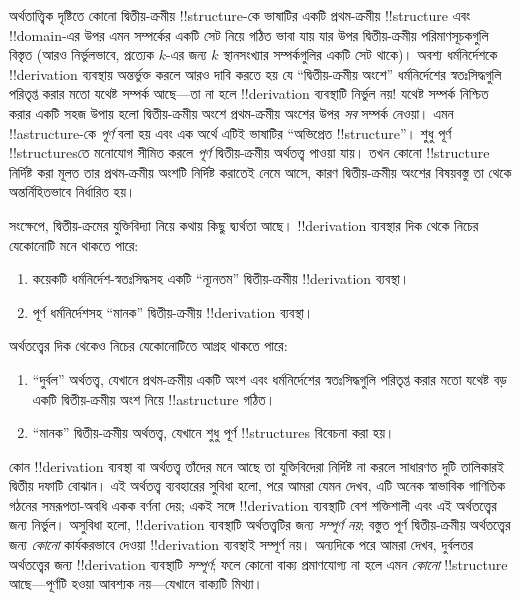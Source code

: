 \documentclass[../../../include/open-logic-section]{subfiles}
\begin{document}
অর্থতাত্ত্বিক দৃষ্টিতে কোনো দ্বিতীয়-ক্রমীয় !!{structure}-কে ভাষাটির
একটি প্রথম-ক্রমীয় !!{structure} এবং !!{domain}-এর উপর এমন সম্পর্কের
একটি সেট নিয়ে গঠিত ভাবা যায় যার উপর দ্বিতীয়-ক্রমীয় পরিমাণসূচকগুলি
বিস্তৃত (আরও নির্ভুলভাবে, প্রত্যেক $k$-এর জন্য $k$ স্থানসংখ্যার
সম্পর্কগুলির একটি সেট থাকে)। অবশ্য ধর্মনির্দেশকে !!{derivation}
ব্যবস্থায় অন্তর্ভুক্ত করলে আরও দাবি করতে হয় যে “দ্বিতীয়-ক্রমীয়
অংশে” ধর্মনির্দেশের স্বতঃসিদ্ধগুলি পরিতৃপ্ত করার মতো যথেষ্ট সম্পর্ক
আছে---তা না হলে !!{derivation} ব্যবস্থাটি নির্ভুল নয়!{} যথেষ্ট সম্পর্ক
নিশ্চিত করার একটি সহজ উপায় হলো দ্বিতীয়-ক্রমীয় অংশে প্রথম-ক্রমীয়
অংশের উপর \emph{সব} সম্পর্ক নেওয়া। এমন !!a{structure}-কে
\emph{পূর্ণ} বলা হয় এবং এক অর্থে এটিই ভাষাটির “অভিপ্রেত
!!{structure}”। শুধু পূর্ণ !!{structure}sতে মনোযোগ সীমিত করলে
\emph{পূর্ণ} দ্বিতীয়-ক্রমীয় অর্থতত্ত্ব পাওয়া যায়। তখন কোনো
!!{structure} নির্দিষ্ট করা মূলত তার প্রথম-ক্রমীয় অংশটি নির্দিষ্ট
করাতেই নেমে আসে, কারণ দ্বিতীয়-ক্রমীয় অংশের বিষয়বস্তু তা থেকে
অন্তর্নিহিতভাবে নির্ধারিত হয়।

সংক্ষেপে, দ্বিতীয়-ক্রমের যুক্তিবিদ্যা নিয়ে কথায় কিছু দ্ব্যর্থতা
আছে। !!{derivation} ব্যবস্থার দিক থেকে নিচের যেকোনোটি মনে থাকতে পারে:
\begin{enumerate}
\item কয়েকটি ধর্মনির্দেশ-স্বতঃসিদ্ধসহ একটি “ন্যূনতম” দ্বিতীয়-ক্রমীয়
  !!{derivation} ব্যবস্থা।
\item পূর্ণ ধর্মনির্দেশসহ “মানক” দ্বিতীয়-ক্রমীয় !!{derivation}
  ব্যবস্থা।
\end{enumerate}
অর্থতত্ত্বের দিক থেকেও নিচের যেকোনোটিতে আগ্রহ থাকতে পারে:
\begin{enumerate}
\item “দুর্বল” অর্থতত্ত্ব, যেখানে প্রথম-ক্রমীয় একটি অংশ এবং
  ধর্মনির্দেশের স্বতঃসিদ্ধগুলি পরিতৃপ্ত করার মতো যথেষ্ট বড় একটি
  দ্বিতীয়-ক্রমীয় অংশ নিয়ে !!a{structure} গঠিত।
\item “মানক” দ্বিতীয়-ক্রমীয় অর্থতত্ত্ব, যেখানে শুধু পূর্ণ
  !!{structure}s বিবেচনা করা হয়।
\end{enumerate}
কোন !!{derivation} ব্যবস্থা বা অর্থতত্ত্ব তাঁদের মনে আছে তা
যুক্তিবিদেরা নির্দিষ্ট না করলে সাধারণত দুটি তালিকারই দ্বিতীয় দফাটি
বোঝান। এই অর্থতত্ত্ব ব্যবহারের সুবিধা হলো, পরে আমরা যেমন দেখব, এটি
অনেক স্বাভাবিক গাণিতিক গঠনের সমরূপতা-অবধি একক বর্ণনা দেয়; একই সঙ্গে
!!{derivation} ব্যবস্থাটি বেশ শক্তিশালী এবং এই অর্থতত্ত্বের জন্য
নির্ভুল। অসুবিধা হলো, !!{derivation} ব্যবস্থাটি অর্থতত্ত্বটির জন্য
\emph{সম্পূর্ণ নয়}; বস্তুত পূর্ণ দ্বিতীয়-ক্রমীয় অর্থতত্ত্বের জন্য
\emph{কোনো} কার্যকরভাবে দেওয়া !!{derivation} ব্যবস্থাই সম্পূর্ণ নয়।
অন্যদিকে পরে আমরা দেখব, দুর্বলতর অর্থতত্ত্বের জন্য !!{derivation}
ব্যবস্থাটি \emph{সম্পূর্ণ}; ফলে কোনো বাক্য প্রমাণযোগ্য না হলে এমন
\emph{কোনো} !!{structure} আছে---পূর্ণটি হওয়া আবশ্যক নয়---যেখানে
বাক্যটি মিথ্যা।
\end{document}
